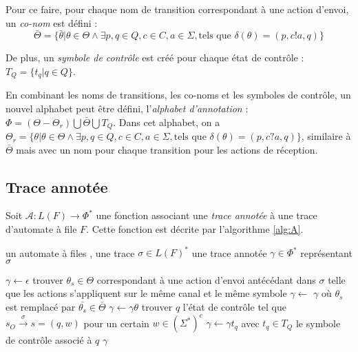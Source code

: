 Pour ce faire, pour chaque nom de transition correspondant à une action d'envoi, un \emph{co-nom} est défini :
$$
\bar{\Theta}=\{\bar{\theta}|\theta\in\Theta\wedge\exists p,q \in Q, c\in C, a\in\Sigma,\text{tels que } \delta(\theta)=(p,c!a,q)\}
$$

De plus, un \emph{symbole de contrôle} est créé pour chaque état de contrôle : $T_Q = \{t_q | q\in Q\}$.

En combinant les noms de transitions, les co-noms et les symboles de contrôle, un nouvel alphabet peut être défini, l'\emph{alphabet d'annotation} : $\Phi=(\Theta-\Theta_r)\bigcup\bar{\Theta}\bigcup T_Q$. Dans cet alphabet, on a $\Theta_r=\{\theta|\theta\in\Theta\wedge\exists p,q \in Q, c\in C, a\in\Sigma,\text{tels que } \delta(\theta)=(p,c?a,q)\}$, similaire à $\bar{\Theta}$ mais avec un nom pour chaque transition pour les actions de réception.


\subsection{Trace annotée}


Soit $\mathcal{A}:L(F)\rightarrow\Phi^*$ une fonction associant une \emph{trace annotée} à une trace d'automate à file $F$. Cette fonction est décrite par l'algorithme \ref{alg:A}.

\begin{algorithm}[H]
  	\begin{algorithmic}[1]
    \REQUIRE un automate à files \fifo , une trace $\sigma\in L(F)^*$
		\ENSURE une trace annotée $\gamma\in\Phi^*$ représentant $\sigma$

    \STATE $\gamma\leftarrow\epsilon$
        \STATE trouver $\theta_s\in\Theta$ correspondant à une action d'envoi antécédant dans $\sigma$ telle que les actions s'appliquent sur le même canal et le même symbole
        \STATE $\gamma\leftarrow$ $\gamma$ où $\theta_s$ est remplacé par $\bar{\theta_s}\in\bar{\Theta}$ 
        \STATE $\gamma\leftarrow\gamma\theta$
      \ENDIF
    \ENDFOR
    \STATE trouver $q$ l'état de contrôle tel que $s_O\xrightarrow{\sigma}s=(q,w)$ pour un certain $w\in(\Sigma^*)^c$
    \STATE $\gamma\leftarrow\gamma t_q$ avec $t_q\in T_Q$ le symbole de contrôle associé à $q$
		\RETURN $\gamma$
	\end{algorithmic}
	\caption{$\mathcal{A}:L(F)^*\rightarrow\Phi^*$}\label{alg:A}
\end{algorithm}

